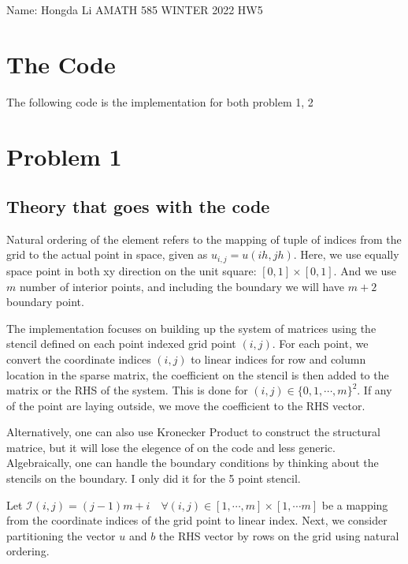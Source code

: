 \documentclass[]{article}
\begin{document}
\begin{center}
    Name: Hongda Li 
    AMATH 585 WINTER 2022 HW5
\end{center}
\section*{The Code}
    The following code is the implementation for both problem 1, 2
    
\section*{Problem 1}
    \subsection*{Theory that goes with the code}
        \hspace{1.1em}
        Natural ordering of the element refers to the mapping of tuple of indices from the grid to the actual point in space, given as $u_{i, j} = u(ih, jh)$. Here, we use equally space point in both xy direction on the unit square: $[0, 1]\times [0, 1]$. And we use $m$ number of interior points, and including the boundary we will have $m + 2$ boundary point. 
        \par
        The implementation focuses on building up the system of matrices using the stencil defined on each point indexed grid point $(i, j)$. For each point, we convert the coordinate indices $(i, j)$ to linear indices for row and column location in the sparse matrix, the coefficient on the stencil is then added to the matrix or the RHS of the system. This is done for $(i, j) \in \{0, 1, \cdots, m\}^2$. If any of the point are laying outside, we move the coefficient to the RHS vector. 
        \par
        Alternatively, one can also use Kronecker Product to construct the structural matrice, but it will lose the elegence of on the code and less generic. Algebraically, one can handle the boundary conditions by thinking about the stencils on the boundary. I only did it for the 5 point stencil. 
        \par
        Let $\mathcal{I}(i, j) = (j - 1)m + i \quad \forall (i, j) \in [1, \cdots, m]\times[1, \cdots m]$ be a mapping from the coordinate indices of the grid point to linear index. Next, we consider partitioning the vector $u$ and $b$ the RHS vector by rows on the grid using natural ordering. 
\end{document}
